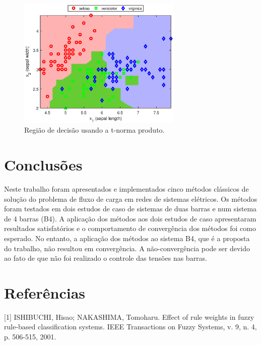\documentclass[12pt,a4paper]{article}
\numberwithin{equation}{section}
\begin{document}
\begin{figure}[ht]
\centering
\includegraphics[width=0.7\textwidth]{product.eps}
\caption{Região de decisão usando a t-norma produto.}
\label{fig:produst}
\end{figure}

\newpage
\section{Conclusões}

Neste trabalho foram apresentados e implementados cinco métodos clássicos de solução
do problema de fluxo de carga em redes de sistemas elétricos.
Os métodos foram testados em dois estudos de caso de sistemas de duas barras e num sistema
de 4 barras (B4).
A aplicação dos métodos aos dois estudos de caso apresentaram resultados satisfatórios
e o comportamento de convergência dos métodos foi como esperado. 
No entanto, a aplicação dos métodos ao sistema B4, que é a proposta do trabalho, não 
resultou em convergência. A não-convergência pode ser devido ao fato de que não foi
realizado o controle das tensões nas barras. 

\newpage

\section*{Referências}
%

[1] ISHIBUCHI, Hisao; NAKASHIMA, Tomoharu. Effect of rule weights in fuzzy rule-based classification systems. IEEE Transactions on Fuzzy Systems, v. 9, n. 4, p. 506-515, 2001.
\end{document}
